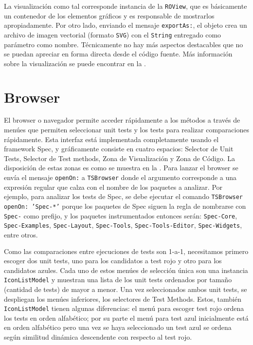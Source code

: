 \par La visualización como tal corresponde instancia de la {\tt ROView}, que es básicamente un contenedor de los elementos gráficos y es responsable de mostrarlos apropiadamente. Por otro lado, enviando el mensaje {\tt exportAs:}, el objeto crea un archivo de imagen vectorial (formato {\tt SVG}) con el {\tt String} entregado como parámetro como nombre. Técnicamente no hay más aspectos destacables que no se puedan apreciar en forma directa desde el código fuente. Más información sobre la visualización se puede encontrar en la . 

\section{Browser}
\par El browser o navegador permite acceder rápidamente a los métodos a través de menúes que permiten seleccionar unit tests y los tests para realizar comparaciones rápidamente.  Esta interfaz está implementada completamente usando el framework Spec, y gráficamente consiste en cuatro espacios: Selector de Unit Tests, Selector de Test methods, Zona de Visualización y Zona de Código. La disposición de estas zonas es como se muestra en la . Para lanzar el browser se envía el mensaje {\tt openOn:} a {\tt TSBrowser} donde el argumento corresponde a una expresión regular que calza con el nombre de los paquetes a analizar. Por ejemplo, para analizar los tests de Spec, se debe ejecutar el comando {\tt TSBrowser openOn: 'Spec-*'} porque los paquetes de Spec siguen la regla de nombrarse con {\tt Spec-} como prefijo, y los paquetes instrumentados entonces serán: {\tt Spec-Core}, {\tt Spec-Examples}, {\tt Spec-Layout}, {\tt Spec-Tools}, {\tt Spec-Tools-Editor}, {\tt Spec-Widgets}, entre otros.  

\par Como las comparaciones entre ejecuciones de tests son 1-a-1, necesitamos primero escoger dos unit tests, uno para los candidatos a test rojo y otro para los candidatos azules. Cada uno de estos menúes de selección única son una instancia {\tt IconListModel} y muestran una lista de los unit tests ordenados por tamaño (cantidad de tests) de mayor a menor. Una vez seleccionados ambos unit tests, se despliegan los menúes inferiores, los selectores de Test Methods. Estos, también {\tt IconListModel} tienen algunas diferencias: el menú para escoger test rojo ordena los tests en orden alfabético; por su parte el menú para test azul inicialmente está en orden alfabético pero una vez se haya seleccionado un test azul se ordena según similitud dinámica descendente con respecto al test rojo. 


